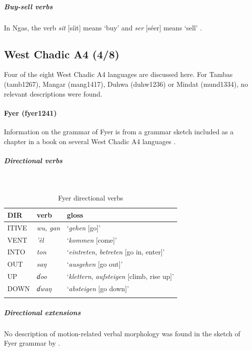 \subparagraph{Buy-sell verbs}



In Ngas, the verb \textit{sit} [síit] means `buy' and \textit{ser} [séer] means `sell' \citep[216--217]{jungraithmayrNgasLanguageShik2016}. 

\subsection{West Chadic A4 (4/8)}

Four of the eight West Chadic A4 languages are discussed here. For Tambas (tamb1267), Mangar (mang1417), Duhwa (duhw1236) or Mindat (mund1334), no relevant descriptions were found.

\paragraph*{Fyer (fyer1241)}

Information on the grammar of Fyer is from a grammar sketch included as a chapter in a book on several West Chadic A4 languages \citep{jungraithmayrRonSprachenTaschadohamitischeStudien1970}.

\subparagraph{Directional verbs}~



\begin{table}[H]
	\caption{Fyer directional verbs} 
	\label{tab:fyerV}
	\begin{tabular}{lll} %
		\lsptoprule
		DIR & verb & gloss   \\ %
		\midrule
		ITIVE & \textit{wu, gan} & `\textit{gehen} [go]' \\
		VENT & \textit{'èl} & `\textit{kommen} [come]' \\
        INTO& \textit{ton} & `\textit{eintreten}, \textit{betreten} [go in, enter]' \\		OUT &  \textit{saŋ} & `\textit{ausgehen} [go out]' \\
		UP & \textit{ɗoo} & `\textit{klettern}, \textit{aufsteigen} [climb, rise up]' \\
		DOWN & \textit{ɗwaŋ} & `\textit{absteigen} [go down]' \\
		\lspbottomrule
	\end{tabular}
\end{table}

\subparagraph{Directional extensions}


No description of motion-related verbal morphology was found in the sketch of Fyer grammar by \citet[15--96]{jungraithmayrRonSprachenTaschadohamitischeStudien1970}.

